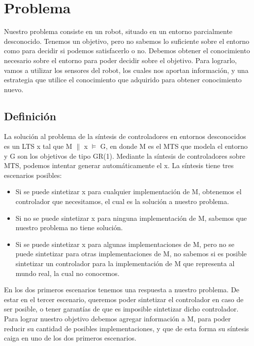 \chapter{Problema}

Nuestro problema consiste en un robot, situado en un entorno parcialmente desconocido. Tenemos un objetivo, pero no 
sabemos lo suficiente sobre el entorno como para decidir si podemos satisfacerlo o no.
Debemos obtener el conocimiento necesario sobre el entorno para poder decidir sobre el objetivo. Para lograrlo, vamos
a utilizar los sensores del robot, los cuales nos aportan información, y una estrategia que utilice
el conocimiento que adquirido para obtener conocimiento nuevo.

\section{Definición}

La solución al problema de la síntesis de controladores en entornos desconocidos es un LTS x tal que M $\parallel$ x $\models$ G, 
en donde M es el MTS que modela el entorno y G son los objetivos de tipo GR(1). Mediante la síntesis de controladores sobre MTS,
podemos intentar generar automáticamente el x. La síntesis tiene tres escenarios posibles:

\begin{itemize}

\item
Si se puede sintetizar x para cualquier implementación de M, obtenemos el controlador que necesitamos, el cual es la
solución a nuestro problema.

\item
Si no se puede sintetizar x para ninguna implementación de M, sabemos que nuestro problema no tiene solución.

\item
Si se puede sintetizar x para algunas implementaciones de M, pero no se puede sintetizar para otras implementaciones de M,
no sabemos si es posible sintetizar un controlador para la implementación de M que representa al mundo real, la cual no conocemos.

\end{itemize}

\vspace{\baselineskip}
En los dos primeros escenarios tenemos una respuesta a nuestro problema. De estar en el tercer escenario, queremos poder sintetizar
el controlador en caso de ser posible, o tener garantías de que es imposible sintetizar dicho controlador. Para lograr nuestro objetivo
debemos agregar información a M, para poder reducir su cantidad de posibles implementaciones, y que de esta forma su síntesis caiga
en uno de los dos primeros escenarios.


